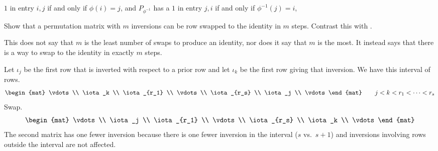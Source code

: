 \begin{exercises}
\begin{answer}
        $1$ in entry $i,j$ if and only if $\phi(i)=j$,
        and $P_{\phi^{-1}}$ has a 
        $1$ in entry $j,i$ if and only if $\phi^{-1}(j)=i$,
      \end{answer}
  \recommended \item 
    Show that a permutation matrix with \( m \) inversions can be
    row swapped to the identity in \( m \) steps.
    Contrast this with .
    \begin{answer}
      This does not say that \( m \) is the least number of swaps to produce
      an identity, nor does it say that \( m \) is the most.
      It instead says that 
      there is a way to swap to the identity in exactly \( m \) steps.

      Let \( \iota_j \) be the first row that is inverted with respect
      to a prior row
      and let \( \iota_k \) be the first row giving that inversion.
      We have this interval of rows.
      \begin{equation*}
         \begin{mat}
           \vdots      \\
           \iota_k     \\
           \iota_{r_1} \\
           \vdots      \\
           \iota_{r_s} \\
           \iota_j     \\
           \vdots
         \end{mat}
         \qquad j<k<r_1<\dots <r_s
      \end{equation*}
      Swap.
      \begin{equation*}
         \begin{mat}
           \vdots      \\
           \iota_j     \\
           \iota_{r_1} \\
           \vdots      \\
           \iota_{r_s} \\
           \iota_k     \\
           \vdots
         \end{mat}
      \end{equation*}
      The second matrix has one fewer inversion because there is one
      fewer inversion
      in the interval (\( s \) vs.\ \( s+1 \)) and inversions involving
      rows outside the interval are not affected.


\end{answer}
\end{exercises}
